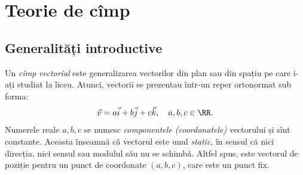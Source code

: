 \chapter{Teorie de cîmp}


\section{Generalități introductive}

Un \emph{cîmp vectorial} este generalizarea vectorilor din plan sau din spațiu
pe care i-ați studiat la liceu. Atunci, vectorii se prezentau într-un reper
ortonormat sub forma:
\[
  \vec{v} = a \vec{i} + b \vec{j} + c \vec{k}, \quad a, b, c \in \RR.
\]
Numerele reale $ a, b, c $ se numesc \emph{componentele (coordonatele)}
vectorului și sînt constante. Aceasta înseamnă că vectorul este unul
\emph{static}, în sensul că nici direcția, nici sensul sau modulul său
nu se schimbă. Altfel spus, este vectorul de poziție pentru un punct
de coordonate $(a, b, c)$, care este un punct fix.

